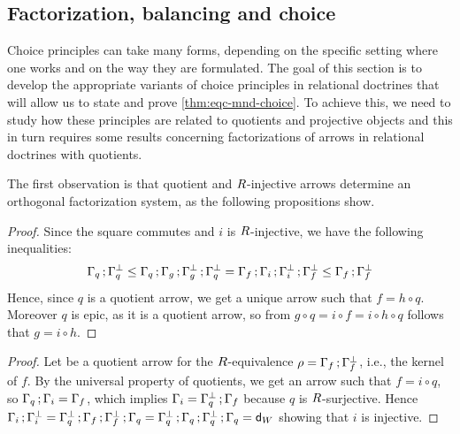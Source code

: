 
\subsection{Factorization, balancing and choice} 
\label{sect:quot-factor} 
 
Choice principles can take many forms, depending on the specific setting where one works and on the way they are formulated. 
The goal of this section is to develop the appropriate variants of choice principles in relational doctrines 
that will allow us to state and prove \cref{thm:eqc-mnd-choice}. 
To achieve this, we need to study how these principles are related to quotients and projective objects and this in turn requires 
some results concerning factorizations of arrows in relational doctrines with quotients. 

The first observation is that quotient and $R$-injective arrows determine an orthogonal factorization system, as the following propositions show. 

\begin{proof}
Since the square commutes and $i$ is $R$-injective, we have the following inequalities:
\[ 
\Gamma_{q}\mathop{\mathbf{;}}\Gamma_{q}^{\bot} 
  \leq \Gamma_{q}\mathop{\mathbf{;}}\Gamma_{g}\mathop{\mathbf{;}}\Gamma_{g}^{\bot}\mathop{\mathbf{;}}\Gamma_{q}^{\bot} 
  = \Gamma_{f}\mathop{\mathbf{;}}\Gamma_{i}\mathop{\mathbf{;}}\Gamma_{i}^{\bot}\mathop{\mathbf{;}}\Gamma_{f}^{\bot} 
  \leq \Gamma_{f}\mathop{\mathbf{;}}\Gamma_{f}^{\bot} 
\]
Hence, since $q$ is a quotient arrow, we get a unique arrow  such that 
$f = h\circ q$. 
Moreover $q$ is epic, as it is a quotient arrow, so from 
$g\circ q = i\circ f = i\circ h\circ q$ follows that $g = i\circ h$. 
\end{proof}

\begin{proof}
Let  be a quotient arrow for the $R$-equivalence $\rho = \Gamma_{f}\mathop{\mathbf{;}}\Gamma_{f}^{\bot}$, i.e., the kernel of $f$. 
By the universal property of quotients, we get an arrow  such that $f = i\circ q$, so 
$\Gamma_{q}\mathop{\mathbf{;}}\Gamma_{i}=\Gamma_{f}$, which implies $\Gamma_{i} = \Gamma_{q}^{\bot}\mathop{\mathbf{;}}\Gamma_{f}$ because $q$ is $R$-surjective. 
Hence 
$\Gamma_{i}\mathop{\mathbf{;}}\Gamma_{i}^{\bot} = \Gamma_{q}^{\bot}\mathop{\mathbf{;}}\Gamma_{f}\mathop{\mathbf{;}}\Gamma_{f}^{\bot}\mathop{\mathbf{;}}\Gamma_{q} = \Gamma_{q}^{\bot}\mathop{\mathbf{;}}\Gamma_{q}\mathop{\mathbf{;}}\Gamma_{q}^{\bot}\mathop{\mathbf{;}}\Gamma_{q} = \mathsf{d}_W$ showing that $i$ is injective.
\end{proof}

